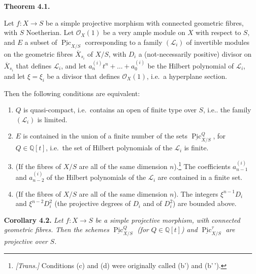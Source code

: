 \documentclass{article}
\providecommand{\tightlist}{%
  \setlength{\itemsep}{0pt}\setlength{\parskip}{0pt}}
\newenvironment{itenv}[1]
  {\phantomsection\par\smallskip\noindent\textbf{#1.}\itshape}
  {\par\smallskip}
\theoremstyle{definition}
\theoremstyle{definition}
\theoremstyle{definition}
\theoremstyle{definition}
\theoremstyle{remark}
\begin{document}
\hypertarget{fga-3-vi-theorem-4.1}{}
\begin{itenv}{Theorem 4.1}

Let \(f\colon X\to S\) be a simple projective morphism with connected geometric fibres, with \(S\) Noetherian.
Let \({\mathscr{O}}_X(1)\) be a very ample module on \(X\) with respect to \(S\), and \(E\) a subset of \(\underline{\operatorname{Pic}}_{X/S}\) corresponding to a family \(({\mathscr{L}}_i)\) of invertible modules on the geometric fibres \(\overline{X}_{s_i}\) of \(X/S\), with \(D_i\) a (not-necessarily positive) divisor on \(\overline{X}_{s_i}\) that defines \({\mathscr{L}}_i\), and let \(a_n^{(i)}t^n+\ldots+a_0^{(i)}\) be the Hilbert polynomial of \({\mathscr{L}}_i\), and let \(\xi=\xi_i\) be a divisor that defines \({\mathscr{O}}_X(1)\), i.e.~a hyperplane section.

Then the following conditions are equivalent:

\begin{enumerate}
\def\labelenumi{\alph{enumi}.}
\tightlist
\item
  \(Q\) is quasi-compact, i.e.~contains an open of finite type over \(S\), i.e.. the family \(({\mathscr{L}}_i)\) is limited.
\item
  \(E\) is contained in the union of a finite number of the sets \(\underline{\operatorname{Pic}}_{X/S}^Q\), for \(Q\in\mathbb{Q}[t]\), i.e.~the set of Hilbert polynomials of the \({\mathscr{L}}_i\) is finite.
\item
  (If the fibres of \(X/S\) are all of the same dimension \(n\)).\footnote{\emph{{[}Trans.{]}} Conditions (c) and (d) were originally called (b') and (b'\,').}
  The coefficients \(a_{n-1}^{(i)}\) and \(a_{n-2}^{(i)}\) of the Hilbert polynomials of the \({\mathscr{L}}_i\) are contained in a finite set.
\item
  (If the fibres of \(X/S\) are all of the same dimension \(n\)).
  The integers \(\xi^{n-1}D_i\) and \(\xi^{n-2}D_i^2\) (the projective degrees of \(D_i\) and of \(D_i^2\)) are bounded above.
\end{enumerate}

\end{itenv}

\leavevmode{}%
\begin{itenv}{Corollary 4.2}
Let \(f\colon X\to S\) be a simple projective morphism, with connected geometric fibres.
Then the schemes \(\underline{\operatorname{Pic}}_{X/S}^Q\) (for \(Q\in\mathbb{Q}[t]\)) and \(\underline{\operatorname{Pic}}_{X/S}^\tau\) are projective over \(S\).

\end{itenv}
\end{document}
